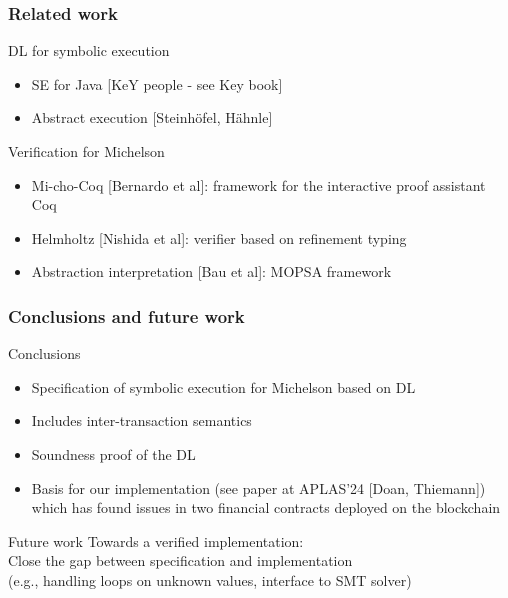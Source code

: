 \documentclass[aspectratio=1610]{beamer}
\begin{document}
\begin{frame}
  \frametitle{Related work}
  \begin{block}{DL for symbolic execution}
    \begin{itemize}
    \item SE for Java [KeY people - see Key book]
    \item Abstract execution [Steinh\"{o}fel, H\"{a}hnle]
    \end{itemize}
  \end{block}
  \begin{block}{Verification for Michelson}
    \begin{itemize}
    \item Mi-cho-Coq [Bernardo et al]: framework for the interactive proof assistant Coq
    \item Helmholtz [Nishida et al]: verifier based on refinement typing
    \item Abstraction interpretation [Bau et al]: MOPSA framework
    \end{itemize}
  \end{block}
\end{frame}
\begin{frame}
  \frametitle{Conclusions and future work}
  \begin{block}{Conclusions}
  \begin{itemize}
  \item Specification of symbolic execution for Michelson based on DL
  \item Includes inter-transaction semantics
  \item Soundness proof of the DL
  \item Basis for our implementation (see paper at APLAS'24 [Doan, Thiemann])\\
    which has found issues in two financial contracts deployed on the blockchain
  \end{itemize}
\end{block}
  \begin{block}{Future work}
    Towards a verified implementation: \\
    Close the gap between specification and implementation \\
    (e.g., handling loops on unknown values, interface to SMT solver)
  \end{block}
\end{frame}
\end{document}
